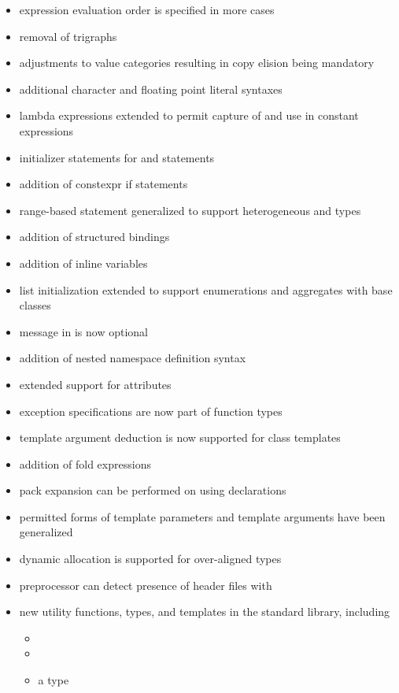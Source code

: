 \begin{itemize}
\item expression evaluation order is specified in more cases
\item removal of trigraphs
\item adjustments to value categories resulting in copy elision being mandatory
\item additional character and floating point literal syntaxes
\item lambda expressions extended to permit capture of  and use in constant expressions
\item initializer statements for  and  statements
\item addition of constexpr if statements
\item range-based  statement generalized to support heterogeneous  and  types
\item addition of structured bindings
\item addition of inline variables
\item list initialization extended to support enumerations and aggregates with base classes
\item message in  is now optional
\item addition of nested namespace definition syntax
\item extended support for attributes
\item exception specifications are now part of function types
\item template argument deduction is now supported for class templates
\item addition of fold expressions
\item pack expansion can be performed on using declarations
\item permitted forms of template parameters and template arguments have been generalized
\item dynamic allocation is supported for over-aligned types
\item preprocessor can detect presence of header files with 
\item new utility functions, types, and templates in the standard library, including
\begin{itemize}
  \item {}
  \item {}
  \item a  type

\end{itemize}
\end{itemize}
